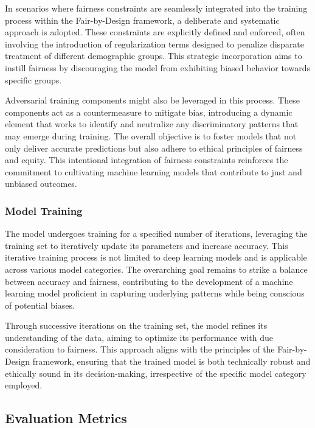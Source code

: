 In scenarios where fairness constraints are seamlessly integrated into the training process within the Fair-by-Design framework, a deliberate and systematic approach is adopted. These constraints are explicitly defined and enforced, often involving the introduction of regularization terms designed to penalize disparate treatment of different demographic groups. This strategic incorporation aims to instill fairness by discouraging the model from exhibiting biased behavior towards specific groups.

Adversarial training components might also be leveraged in this process. These components act as a countermeasure to mitigate bias, introducing a dynamic element that works to identify and neutralize any discriminatory patterns that may emerge during training. The overall objective is to foster models that not only deliver accurate predictions but also adhere to ethical principles of fairness and equity. This intentional integration of fairness constraints reinforces the commitment to cultivating machine learning models that contribute to just and unbiased outcomes.

\subsubsection{Model Training}

The model undergoes training for a specified number of iterations, leveraging the training set to iteratively update its parameters and increase accuracy. This iterative training process is not limited to deep learning models and is applicable across various model categories. The overarching goal remains to strike a balance between accuracy and fairness, contributing to the development of a machine learning model proficient in capturing underlying patterns while being conscious of potential biases.

Through successive iterations on the training set, the model refines its understanding of the data, aiming to optimize its performance with due consideration to fairness. This approach aligns with the principles of the Fair-by-Design framework, ensuring that the trained model is both technically robust and ethically sound in its decision-making, irrespective of the specific model category employed.

\subsection{Evaluation Metrics}


